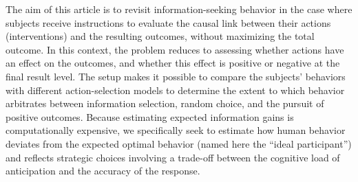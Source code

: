\documentclass[10pt,letterpaper]{article}
\begin{document}

%



The aim of this article is to revisit information-seeking behavior in the case where subjects receive instructions to evaluate the causal link between their actions (interventions) and the resulting outcomes, without maximizing the total outcome. In this context, the problem reduces to assessing whether actions have an effect on the outcomes, and whether this effect is positive or negative at the final result level. The setup makes it possible to compare the subjects' behaviors with different action-selection models to determine the extent to which behavior arbitrates between information selection, random choice, and the pursuit of positive outcomes. Because estimating expected information gains is computationally expensive, we specifically seek to estimate how human behavior deviates from the expected optimal behavior (named here the ``ideal participant'') and reflects strategic choices involving a trade-off between the cognitive load of anticipation and the accuracy of the response.
\end{document}
